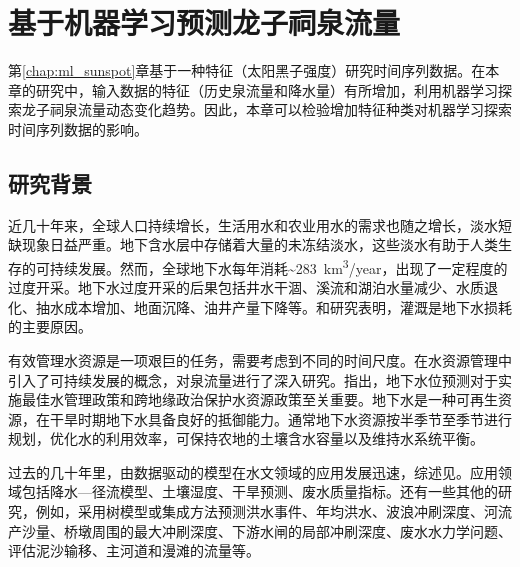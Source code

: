 \chapter{基于机器学习预测龙子祠泉流量}\label{chap:ml_spring}

第\ref{chap:ml_sunspot}章基于一种特征（太阳黑子强度）研究时间序列数据。在本章的研究中，输入数据的特征（历史泉流量和降水量）有所增加，利用机器学习探索龙子祠泉流量动态变化趋势。因此，本章可以检验增加特征种类对机器学习探索时间序列数据的影响。

\section{研究背景}\label{sec:spr_background}

近几十年来，全球人口持续增长，生活用水和农业用水的需求也随之增长，淡水短缺现象日益严重\citep{portmann2010mirca2000,iglesias2015adaptation}。地下含水层中存储着大量的未冻结淡水，这些淡水有助于人类生存的可持续发展。然而，全球地下水每年消耗\sim\SI{283}{km^{3}/year}，出现了一定程度的过度开采\citep{wada2010global}。地下水过度开采的后果包括井水干涸、溪流和湖泊水量减少、水质退化、抽水成本增加、地面沉降、油井产量下降等\citep{bartolino2003ground,nayak2006groundwater}。\citet{dalin2017groundwater}和\citet{butler2018sustainability}研究表明，灌溉是地下水损耗的主要原因。

有效管理水资源是一项艰巨的任务，需要考虑到不同的时间尺度\citep{galelli2010building}。\citet{kresic2009groundwater}在水资源管理中引入了可持续发展的概念，对泉流量进行了深入研究。\citet{coppola2003artificial}指出，地下水位预测对于实施最佳水管理政策和跨地缘政治保护水资源政策至关重要。地下水是一种可再生资源，在干旱时期地下水具备良好的抵御能力。通常地下水资源按半季节至季节进行规划，优化水的利用效率，可保持农地的土壤含水容量以及维持水系统平衡。

过去的几十年里，由数据驱动的模型在水文领域的应用发展迅速，综述见\citep{abrahart2012two,deka2014support}。应用领域包括降水---径流模型\citep{dibike2001model,solomatine2003model,granata2016support}、土壤湿度\citep{ahmad2010estimating}、干旱预测\citep{le2016meteorological}、废水质量指标\citep{granata2017machine}。还有一些其他的研究，例如，采用树模型或集成方法预测洪水事件\citep{solomatine2004m5}、年均洪水\citep{singh2010estimation}、波浪冲刷深度\citep{etemad2011model}、河流产沙量\citep{goyal2014modeling}、桥墩周围的最大冲刷深度\citep{najafzadeh2016prediction}、下游水闸的局部冲刷深度\citep{najafzadeh2017prediction}、废水水力学问题\citep{granata2017machine}、评估泥沙输移\citep{najafzadeh2017application}、主河道和漫滩的流量\citep{zahiri2018optimized}等。


